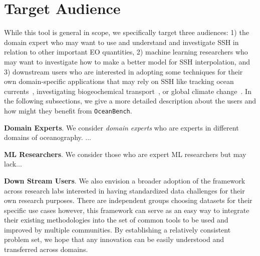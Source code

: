 \section{Target Audience}
While this tool is general in scope, we specifically target three audiences: 1) the domain expert who may want to use and understand and investigate SSH in relation to other important EO quantities, 2) machine learning researchers who may want to investigate how to make a better model for SSH interpolation, and 3) downstream users who are interested in adopting some techniques for their own domain-specific applications that may rely on SSH like tracking ocean currents~\tocite{}, investigating biogeochemical transport~\tocite{}, or global climate change~\tocite{}. In the following subsections, we give a more detailed description about the users and how might they benefit from \texttt{OceanBench}.

\textbf{Domain Experts}. We consider \textit{domain experts} who are experts in different domains of oceanography. ...


\textbf{ML Researchers}. We consider those who are expert ML researchers but may lack...



\textbf{Down Stream Users}. We also envision a broader adoption of the framework across research labs interested in having standardized data challenges for their own research purposes. There are independent groups choosing datasets for their specific use cases however, this framework can serve as an easy way to integrate their existing methodologies into the set of common tools to be used and improved by multiple communities. By establishing a relatively consistent problem set, we hope that any innovation can be easily understood and transferred across domains.